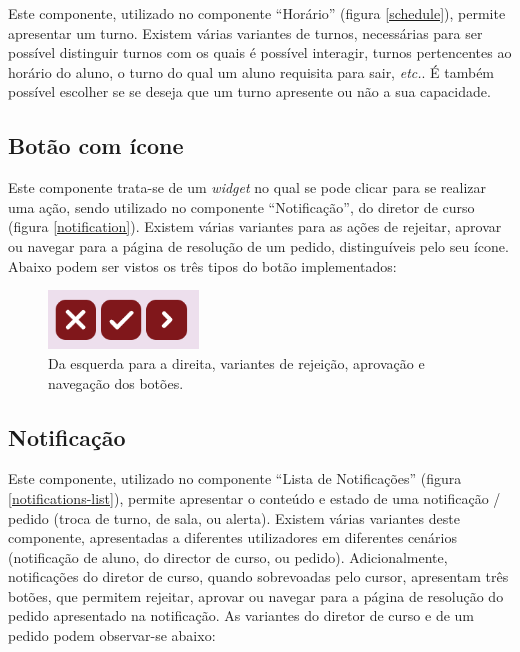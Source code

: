 \documentclass[12pt, a4paper]{article}
\begin{document}
Este componente, utilizado no componente ``Horário'' (figura \ref{schedule}), permite apresentar um
turno. Existem várias variantes de turnos, necessárias para ser possível distinguir turnos com os
quais é possível interagir, turnos pertencentes ao horário do aluno, o turno do qual um aluno
requisita para sair, \emph{etc.}. É também possível escolher se se deseja que um turno apresente ou
não a sua capacidade.

\subsection{Botão com ícone}

Este componente trata-se de um \emph{widget} no qual se pode clicar para se realizar uma ação,
sendo utilizado no componente ``Notificação'', do diretor de curso (figura \ref{notification}).
Existem várias variantes para as ações de rejeitar, aprovar ou navegar para a página de resolução
de um pedido, distinguíveis pelo seu ícone. Abaixo podem ser vistos os três tipos do botão
implementados:

\begin{figure}[H]
    \centering
    \includegraphics[width=4cm]{res/components/icon-button.png}
    \caption{Da esquerda para a direita, variantes de rejeição, aprovação e navegação dos botões.}
    \label{icon-button}
\end{figure}

\subsection{Notificação}

Este componente, utilizado no componente ``Lista de Notificações'' (figura
\ref{notifications-list}), permite apresentar o conteúdo e estado de uma notificação / pedido
(troca de turno, de sala, ou alerta). Existem várias variantes deste componente, apresentadas a
diferentes utilizadores em diferentes cenários (notificação de aluno, do director de curso, ou
pedido). Adicionalmente, notificações do diretor de curso, quando sobrevoadas pelo cursor,
apresentam três botões, que permitem rejeitar, aprovar ou navegar para a página de resolução do
pedido apresentado na notificação. As variantes do diretor de curso e de um pedido podem observar-se
abaixo:
\end{document}
